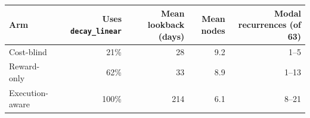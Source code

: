 \begin{tabular}{lrrrr}
\toprule
Arm & Uses \texttt{decay\_linear} & Mean lookback (days) & Mean nodes & Modal recurrences (of 63) \\
\midrule
Cost-blind & 21\% & 28 & 9.2 & 1--5 \\
Reward-only & 62\% & 33 & 8.9 & 1--13 \\
Execution-aware & 100\% & 214 & 6.1 & 8--21 \\
\bottomrule
\end{tabular}
